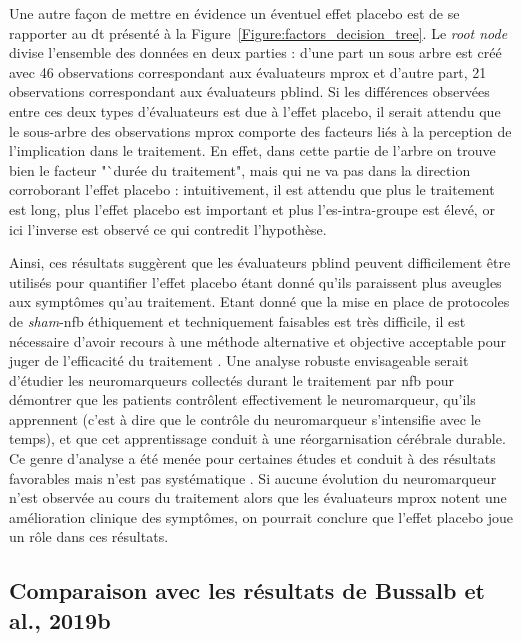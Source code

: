Une autre façon de mettre en évidence un éventuel effet placebo est de se rapporter au \gls{dt} présenté à la Figure~\ref{Figure:factors_decision_tree}. Le 
\textit{root node} divise l'ensemble des données en deux parties : d'une part un sous arbre est créé avec 46 observations correspondant aux évaluateurs
\gls{mprox} et d'autre part, 21 observations correspondant aux évaluateurs \gls{pblind}. Si les différences observées entre ces deux types d'évaluateurs est due à l'effet
placebo, il serait attendu que le sous-arbre des observations \gls{mprox} comporte des facteurs liés à la perception de l'implication dans le traitement. En effet, dans cette
partie de l'arbre on trouve bien le facteur "`durée du traitement", mais qui ne va pas dans la direction corroborant l'effet placebo : intuitivement, 
il est attendu que plus le traitement est long, plus l'effet placebo est important et plus l'\gls{es}-intra-groupe est élevé, or ici l'inverse est observé ce qui
contredit l'hypothèse. 

Ainsi, ces résultats suggèrent que les évaluateurs \gls{pblind} peuvent difficilement être utilisés pour quantifier l'effet placebo étant donné qu'ils paraissent
plus aveugles aux symptômes qu'au traitement. Etant donné que la mise en place de protocoles de \textit{sham}-\gls{nfb} éthiquement \citep{Holtmann2014} et techniquement 
\citep{Birbaumer1991} faisables est très difficile, il est nécessaire d'avoir recours à une méthode alternative et objective acceptable pour juger de l'efficacité du traitement 
\citep{World-Medical-Association2000}. Une analyse robuste envisageable serait d'étudier les neuromarqueurs collectés durant le traitement par \gls{nfb} pour démontrer que les 
patients contrôlent effectivement le neuromarqueur, qu'ils apprennent (c'est à dire que le contrôle du neuromarqueur s'intensifie avec le temps), et que cet apprentissage conduit 
à une réorgarnisation cérébrale durable. Ce genre d'analyse a été menée pour certaines études et conduit à des résultats favorables mais n'est pas 
systématique \citep{Arns2014}. Si aucune évolution du neuromarqueur n'est observée au cours du traitement alors que les évaluateurs \gls{mprox} notent une amélioration clinique 
des symptômes, on pourrait conclure que l'effet placebo joue un rôle dans ces résultats.

\subsection{Comparaison avec les résultats de Bussalb et al., 2019b}

